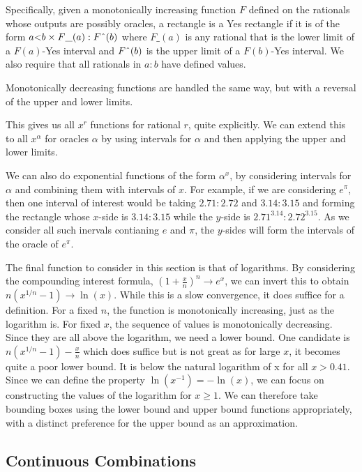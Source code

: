 \documentclass[12pt]{article}
\theoremstyle{remark}
\newcommand{\lt}{\mathord{<}}
\begin{document}
Specifically, given a monotonically increasing function $F$ defined on the rationals whose outputs are possibly oracles, a rectangle is a Yes rectangle if it is of the form  $a \lt b \times F\_(a):F\string^ (b)$  where $F\_(a)$ is any rational that is the lower limit of a $F(a)$-Yes interval and $F\string^ (b)$ is the upper limit of a $F(b)$-Yes interval. We also require that all rationals in $a:b$ have defined values. 

Monotonically decreasing functions are handled the same way, but with a reversal of the upper and lower limits. 

This gives us all $x^r$ functions for rational $r$, quite explicitly. We can extend this to all $x^{\alpha}$ for oracles $\alpha$ by using intervals for $\alpha$ and then applying the upper and lower limits. 

We can also do exponential functions of the form $\alpha^{x}$, by considering intervals for $\alpha$ and combining them with intervals of $x$. For example, if we are considering $e^{\pi}$, then one interval of interest would be taking $2.71:2.72$ and $3.14:3.15$ and forming the rectangle whose $x$-side is $3.14:3.15$ while the $y$-side is $2.71^{3.14}:2.72^{3.15}$. As we consider all such inervals contianing $e$ and $\pi$, the $y$-sides will form the intervals of the oracle of $e^{\pi}$.

The final function to consider in this section is that of logarithms. By considering the compounding interest formula, $(1+ \frac{x}{n})^n \to e^x$, we can invert this to obtain $n (x^{1/n} - 1) \to \ln(x)$. While this is a slow convergence, it does suffice for a definition. For a fixed $n$, the function is monotonically increasing, just as the logarithm is. For fixed $x$, the sequence of values is monotonically decreasing. Since they are all above the logarithm, we need a lower bound. One candidate is  $n (x^{1/n} - 1) - \frac{x}{n} $ which does suffice but is not great as for large $x$, it becomes quite a poor lower bound. It is below the natural logarithm of x for all $x > 0.41$. Since we can define the property $\ln(x^{-1}) = - \ln(x)$, we can focus on constructing the values of the logarithm for $x\geq 1$. We can therefore take bounding boxes using the lower bound and upper bound functions appropriately, with a distinct preference for the upper bound as an approximation.  

\subsection{Continuous Combinations}
\end{document}
